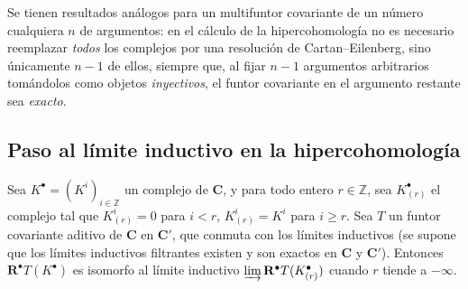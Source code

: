 Se tienen resultados análogos para un multifuntor covariante de un número cualquiera $n$ de argumentos: en el cálculo de la hipercohomología no es necesario reemplazar \emph{todos} los complejos
por una resolución de Cartan--Eilenberg, sino únicamente $n-1$ de ellos, siempre que, al fijar $n-1$ argumentos arbitrarios tomándolos como objetos \emph{inyectivos}, el funtor covariante en el argumento restante sea \emph{exacto}.


\subsection{Paso al límite inductivo en la hipercohomología}
\label{subsection:0.11.5}
\label{subsection:0.11.5-fr}

\begin{lemma}[11.5.1]
\label{0.11.5.1-fr}
Sea $K^\bullet=(K^i)_{i\in\mathbb Z}$ un complejo de $\boldsymbol{C}$, y para todo entero $r\in\mathbb Z$, sea $K_{(r)}^\bullet$ el complejo tal que $K_{(r)}^i=0$ para $i<r$, $K_{(r)}^i=K^i$ para $i\geq r$. Sea $T$ un funtor covariante aditivo
de $\boldsymbol{C}$ en $\boldsymbol{C}'$, que conmuta con los límites inductivos (se supone que los límites inductivos filtrantes existen y son exactos en $\boldsymbol{C}$ y $\boldsymbol{C}'$). Entonces $\mathbf R^\bullet T(K^\bullet)$ es isomorfo al límite inductivo $\varinjlim\mathbf R^\bullet T(K_{(r)}^\bullet)$ cuando $r$ tiende a $-\infty$.
\end{lemma}

